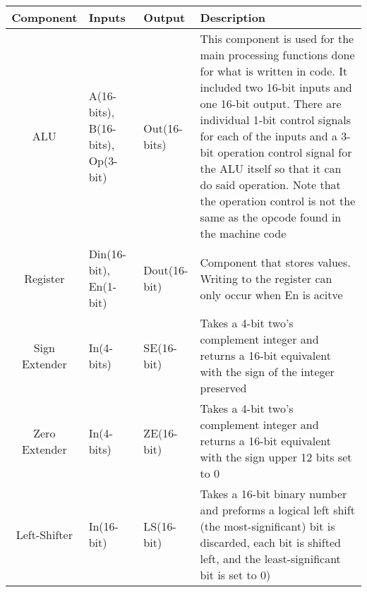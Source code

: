 \documentclass[12pt, a4paper]{report}
\begin{document}
	\begin{minipage}[c]{\textwidth}
			{\renewcommand{\arraystretch}{1.5}
				\begin{tabular}[c]{c|p{2cm}|p{2.5cm}|p{5.5cm}}
					Component & Inputs & Output & Description \\
					\hline
					ALU & A(16-bits), B(16-bits), Op(3-bit) & Out(16-bits) & This component is used for the main processing functions done for what is written in code. It included two 16-bit inputs and one 16-bit output. There are individual 1-bit control signals for each of the inputs and a 3-bit operation control signal for the ALU itself so that it can do said operation. Note that the operation control is not the same as the opcode found in the machine code \\
					\hline
					Register & Din(16-bit), En(1-bit) & Dout(16-bit) & Component that stores values. Writing to the register can only occur
					when En is acitve\\
					\hline
					Sign Extender & In(4-bits) & SE(16-bit) & Takes a 4-bit two's complement integer and returns a 16-bit equivalent with the
					sign of the integer preserved\\
					\hline
					Zero Extender & In(4-bits) & ZE(16-bit) & Takes a 4-bit two's complement integer and returns a 16-bit equivalent with the
					sign upper 12 bits set to 0\\
					\hline
					Left-Shifter & In(16-bit) & LS(16-bit) & Takes a 16-bit binary number and preforms a logical left shift (the most-significant) bit is discarded, each bit is shifted left, and the least-significant bit is set to 0)\\
				\end{tabular}
			}
	\end{minipage}
\end{document}
